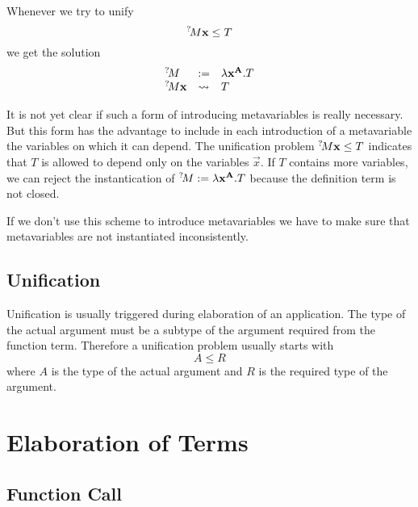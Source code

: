 Whenever we try to unify
$$
    \meta{M} \vec{x} \le T
$$
we get the solution
$$
\begin{array}{lll}
    \meta{M} &:=& \lambda \vec{x}^{\vec{A}}. T

    \\

    \meta{M} \vec{x} &\leadsto& T
\end{array}
$$

It is not yet clear if such a form of introducing metavariables is really
necessary. But this form has the advantage to include in each introduction of a
metavariable the variables on which it can depend. The unification problem
${}^?\!M \mathbf{x} \le T$ indicates that $T$ is allowed to depend only on the
variables $\vec{x}$. If $T$ contains more variables, we can reject the
instantication of ${}^?\!M := \lambda \mathbf{x}^{\mathbf{A}}. T$ because the
definition term is not closed.

If we don't use this scheme to introduce metavariables we have to make sure that
metavariables are not instantiated inconsistently.




\subsection{Unification}

Unification is usually triggered during elaboration of an application. The type
of the actual argument must be a subtype of the argument required from the
function term. Therefore a unification problem usually starts with
$$
    A \le R
$$
where $A$ is the type of the actual argument and $R$ is the required type of the
argument.















\section{Elaboration of Terms}





\subsection{Function Call}


